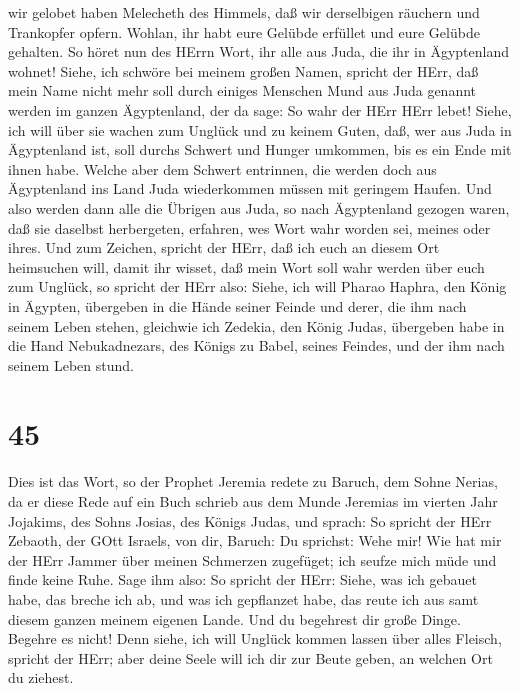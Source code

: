 wir gelobet haben Melecheth des Himmels, daß wir derselbigen räuchern
und Trankopfer opfern. Wohlan, ihr habt eure Gelübde erfüllet und eure
Gelübde gehalten.  So höret nun des HErrn Wort, ihr alle
aus Juda, die ihr in Ägyptenland wohnet! Siehe, ich schwöre bei meinem
großen Namen, spricht der HErr, daß mein Name nicht mehr soll durch
einiges Menschen Mund aus Juda genannt werden im ganzen Ägyptenland, der
da sage: So wahr der HErr HErr lebet!  Siehe, ich will über
sie wachen zum Unglück und zu keinem Guten, daß, wer aus Juda in
Ägyptenland ist, soll durchs Schwert und Hunger umkommen, bis es ein
Ende mit ihnen habe.  Welche aber dem Schwert entrinnen,
die werden doch aus Ägyptenland ins Land Juda wiederkommen müssen mit
geringem Haufen. Und also werden dann alle die Übrigen aus Juda, so nach
Ägyptenland gezogen waren, daß sie daselbst herbergeten, erfahren, wes
Wort wahr worden sei, meines oder ihres.  Und zum Zeichen,
spricht der HErr, daß ich euch an diesem Ort heimsuchen will, damit ihr
wisset, daß mein Wort soll wahr werden über euch zum Unglück,
 so spricht der HErr also: Siehe, ich will Pharao Haphra,
den König in Ägypten, übergeben in die Hände seiner Feinde und derer,
die ihm nach seinem Leben stehen, gleichwie ich Zedekia, den König
Judas, übergeben habe in die Hand Nebukadnezars, des Königs zu Babel,
seines Feindes, und der ihm nach seinem Leben stund.

\hypertarget{section-44}{%
\section{45}\label{section-44}}

 Dies ist das Wort, so der Prophet Jeremia redete zu Baruch,
dem Sohne Nerias, da er diese Rede auf ein Buch schrieb aus dem Munde
Jeremias im vierten Jahr Jojakims, des Sohns Josias, des Königs Judas,
und sprach:  So spricht der HErr Zebaoth, der GOtt Israels,
von dir, Baruch:  Du sprichst: Wehe mir! Wie hat mir der
HErr Jammer über meinen Schmerzen zugefüget; ich seufze mich müde und
finde keine Ruhe.  Sage ihm also: So spricht der HErr:
Siehe, was ich gebauet habe, das breche ich ab, und was ich gepflanzet
habe, das reute ich aus samt diesem ganzen meinem eigenen Lande.
 Und du begehrest dir große Dinge. Begehre es nicht! Denn
siehe, ich will Unglück kommen lassen über alles Fleisch, spricht der
HErr; aber deine Seele will ich dir zur Beute geben, an welchen Ort du
ziehest.

